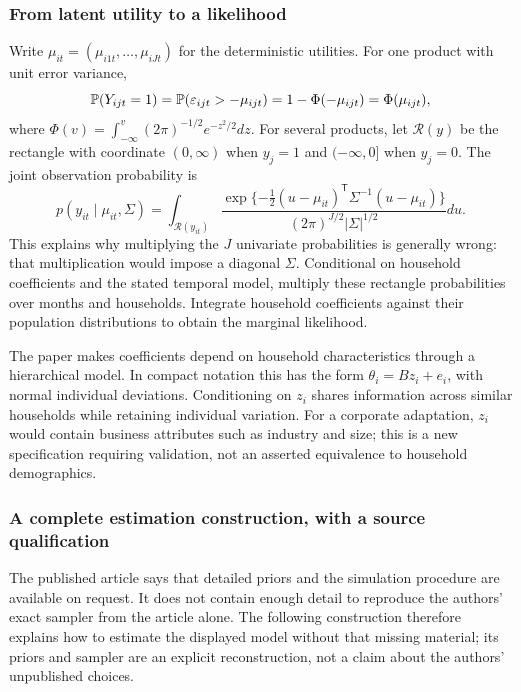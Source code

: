 \subsubsection{From latent utility to a likelihood}

Write $\mu_{it}=(\mu_{i1t},\ldots,\mu_{iJt})$ for the deterministic utilities. For one product with unit error variance,
\[
 \mathbb{P}(Y_{ijt}=1)=\mathbb{P}(\varepsilon_{ijt}>-\mu_{ijt})
 =1-\Phi(-\mu_{ijt})=\Phi(\mu_{ijt}),
\]
where $\Phi(v)=\int_{-\infty}^v(2\pi)^{-1/2}e^{-z^2/2}dz$. For several products, let $\mathcal R(y)$ be the rectangle with coordinate $(0,\infty)$ when $y_j=1$ and $(-\infty,0]$ when $y_j=0$. The joint observation probability is
\begin{equation}
 p(y_{it}\mid\mu_{it},\Sigma)
 =\int_{\mathcal R(y_{it})}
 \frac{\exp\{-\tfrac12(u-\mu_{it})^{\mathsf T}\Sigma^{-1}(u-\mu_{it})\}}
 {(2\pi)^{J/2}|\Sigma|^{1/2}}du.
 \label{eq:li-probit}
\end{equation}
This explains why multiplying the $J$ univariate probabilities is generally wrong: that multiplication would impose a diagonal $\Sigma$. Conditional on household coefficients and the stated temporal model, multiply these rectangle probabilities over months and households. Integrate household coefficients against their population distributions to obtain the marginal likelihood.

The paper makes coefficients depend on household characteristics through a hierarchical model. In compact notation this has the form $\theta_i=Bz_i+e_i$, with normal individual deviations. Conditioning on $z_i$ shares information across similar households while retaining individual variation. For a corporate adaptation, $z_i$ would contain business attributes such as industry and size; this is a new specification requiring validation, not an asserted equivalence to household demographics.

\subsubsection{A complete estimation construction, with a source qualification}

The published article says that detailed priors and the simulation procedure are available on request. It does not contain enough detail to reproduce the authors' exact sampler from the article alone. The following construction therefore explains how to estimate the displayed model without that missing material; its priors and sampler are an explicit reconstruction, not a claim about the authors' unpublished choices.

